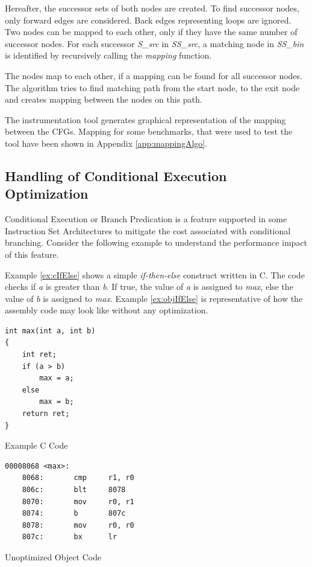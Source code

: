Hereafter, the successor sets of both nodes are created. To find successor nodes, only forward edges are considered. Back edges representing loops are ignored. Two nodes can be mapped to each other, only if they have the same number of successor nodes. For each successor \emph{S\_src} in \emph{SS\_src}, a matching node in \emph{SS\_bin} is identified by recursively calling the \emph{mapping} function. 

The nodes map to each other, if a mapping can be found for all successor nodes. The algorithm tries to find matching path from the start node, to the exit node and creates mapping between the nodes on this path.



The instrumentation tool generates graphical representation of the mapping between the CFGs. Mapping for some benchmarks, that were used to test the tool have been shown in Appendix \ref{app:mappingAlgo}.

\subsection{Handling of Conditional Execution Optimization}
\label{subsec:CondExec}


Conditional Execution or Branch Predication is a feature supported in some Instruction Set Architectures to mitigate the cost associated with conditional branching. Consider the following example to understand the performance impact of this feature.

Example \ref{ex:cIfElse} shows a simple \emph{if-then-else} construct written in C. The code checks if \emph{a} is greater than \emph{b}. If true, the value of \emph{a} is assigned to \emph{max}, else the value of \emph{b} is assigned to \emph{max}. Example \ref{ex:objIfElse} is representative of how the assembly code may look like without any optimization.

\begin{Example}[h]
\begin{lstlisting}
int max(int a, int b)
{
    int ret;
    if (a > b)
        max = a;
    else
        max = b;
    return ret;
}
\end{lstlisting}
\caption{Example C Code}
\label{ex:cIfElse}
\end{Example}

\begin{Example}[h]
\begin{lstlisting}
00008068 <max>:
    8068:       cmp     r1, r0
    806c:       blt     8078   
    8070:       mov     r0, r1
    8074:       b       807c
    8078:       mov     r0, r0
    807c:       bx      lr
\end{lstlisting}
\caption{Unoptimized Object Code}
\label{ex:objIfElse}
\end{Example}

